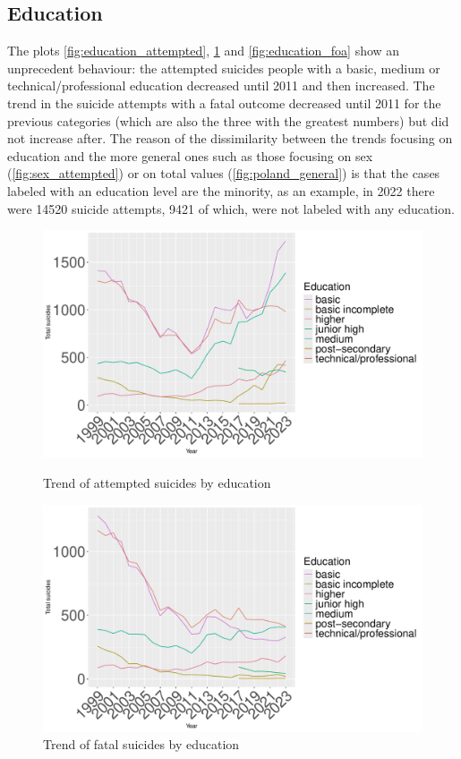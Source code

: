 \documentclass{article}
\begin{document}
\subsection{Education}
The plots \ref{fig:education_attempted}, \ref{fig:education_fatal} and
\ref{fig:education_foa}
show an unprecedent behaviour: the attempted suicides 
people with a basic, medium or technical/professional education decreased until 2011 and then
increased. The trend in the suicide attempts with a fatal outcome decreased
until 2011 for the previous categories (which are also the three with the greatest numbers)
but did not increase after.
The reason of the dissimilarity between the trends focusing on education and the more general
ones such as those focusing on sex (\ref{fig:sex_attempted})
or on total values (\ref{fig:poland_general})
is that the cases labeled with an education level are the minority,
as an example, in 2022 there were 14520 suicide attempts, 9421 of which,
were not labeled with any education.
\begin{figure}[H]
    \centering
    \begin{minipage}{0.45\textwidth}
        \includegraphics[width=\textwidth]{imgs/education_attempted.pdf}
        \caption{Trend of attempted suicides by education }
	\label{fig:education_attempted}
    \end{minipage}
    \hfill
    \begin{minipage}{0.45\textwidth}
        \includegraphics[width=\textwidth]{imgs/education_fatal.pdf}
        \caption{Trend of fatal suicides by education }
	\label{fig:education_fatal}
    \end{minipage}
\end{figure}
\end{document}
